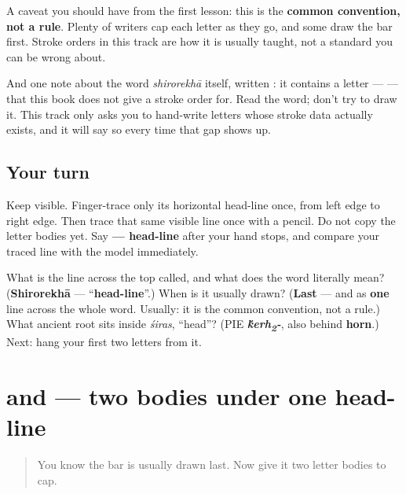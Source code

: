 A caveat you should have from the first lesson: this is the \textbf{common convention, not a rule}. Plenty of writers cap each letter as they go, and some draw the bar first. Stroke orders in this track are how it is usually taught, not a standard you can be wrong about.

And one note about the word \emph{shirorekhā} itself, written \textbf{}: it contains a letter — \textbf{} — that this book does not give a stroke order for. Read the word; don't try to draw it. This track only asks you to hand-write letters whose stroke data actually exists, and it will say so every time that gap shows up.

\subsection*{Your turn}
Keep \textbf{} visible. Finger-trace only its horizontal head-line once, from left edge to right edge. Then trace that same visible line once with a pencil. Do not copy the letter bodies yet. Say \textbf{ — head-line} after your hand stops, and compare your traced line with the model immediately.

\begin{tcolorbox}[breakable,colback=teal!4,colframe=teal!35!black,title={Before you move on}]
What is the line across the top called, and what does the word literally mean? (\textbf{Shirorekhā} — \textquotedblleft{}\textbf{head-line}\textquotedblright{}.) When is it usually drawn? (\textbf{Last} — and as \textbf{one} line across the whole word. Usually: it is the common convention, not a rule.) What ancient root sits inside \emph{śiras}, \textquotedblleft{}head\textquotedblright{}? (PIE \emph{\textbf{\'{k}erh\textsubscript{2}-}}, also behind \textbf{horn}.) Next: hang your first two letters from it.
\end{tcolorbox}
\section[\texorpdfstring{\hi{न}, \hi{म} (na, ma)}{न, म (na, ma)}]{ and  — two bodies under one head-line}

\label{lesson:HI-W01-na-ma}



\begin{quote}
You know the bar is usually drawn last. Now give it two letter bodies to cap.
\end{quote}

